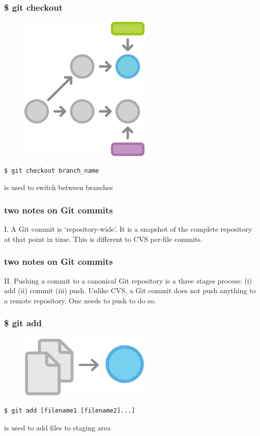 \documentclass{beamer}
\begin{document}
\begin{frame}[fragile]
    \frametitle{\$ git checkout}
    \begin{figure}[h!]
        \begin{center}
            \includegraphics[scale=0.5]{checkout.png}
        \end{center}
    \end{figure}
    \begin{verbatim}
$ git checkout branch_name
    \end{verbatim}
    is used to switch between branches
\end{frame}

\begin{frame}
    \frametitle{two notes on Git commits}
    I. A Git commit is `repository-wide'. It is a snapshot
    of the complete repository at that point in time. This
    is different to CVS per-file commits.
\end{frame}

\begin{frame}
    \frametitle{two notes on Git commits}
    II. Pushing a commit to a canonical Git repository
    is a three stages process: (i) add (ii) commit (iii) push.
    Unlike CVS, a Git commit does not push anything to a remote
    repository. One needs to push to do so.
\end{frame}

\begin{frame}[fragile]
    \frametitle{\$ git add}
    \begin{figure}[h!]
        \begin{center}
            \includegraphics[scale=0.7]{add.png}
        \end{center}
    \end{figure}
    \begin{verbatim}
$ git add [filename1 [filename2]...]
    \end{verbatim}
    is used to add files to staging area
\end{frame}
\end{document}
